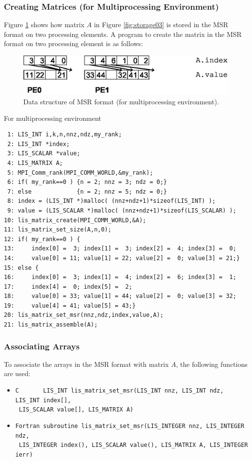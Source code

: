 \documentclass[a4paper]{article}
\begin{document}
\newpage
\subsubsection{Creating Matrices (for Multiprocessing Environment)}
Figure \ref{fig:storage03_mpi} shows how matrix $A$ in Figure
\ref{fig:storage03} is stored in the MSR format on two processing 
elements. A program to create the matrix in the MSR format on two processing element is as follows:
\begin{figure}[h]
{\centering 
\includegraphics{storage03_mpi.eps} 
\caption{Data structure of MSR format (for multiprocessing environment).}\label{fig:storage03_mpi}}
\end{figure}
\begin{itemsquarebox}[l]{For multiprocessing environment}
\small
\begin{verbatim}
 1: LIS_INT i,k,n,nnz,ndz,my_rank;
 2: LIS_INT *index;
 3: LIS_SCALAR *value;
 4: LIS_MATRIX A;
 5: MPI_Comm_rank(MPI_COMM_WORLD,&my_rank);
 6: if( my_rank==0 ) {n = 2; nnz = 3; ndz = 0;}
 7: else             {n = 2; nnz = 5; ndz = 0;}
 8: index = (LIS_INT *)malloc( (nnz+ndz+1)*sizeof(LIS_INT) );
 9: value = (LIS_SCALAR *)malloc( (nnz+ndz+1)*sizeof(LIS_SCALAR) );
10: lis_matrix_create(MPI_COMM_WORLD,&A);
11: lis_matrix_set_size(A,n,0);
12: if( my_rank==0 ) {
13:     index[0] =  3; index[1] =  3; index[2] =  4; index[3] =  0;
14:     value[0] = 11; value[1] = 22; value[2] =  0; value[3] = 21;}
15: else {
16:     index[0] =  3; index[1] =  4; index[2] =  6; index[3] =  1;
17:     index[4] =  0; index[5] =  2;
18:     value[0] = 33; value[1] = 44; value[2] =  0; value[3] = 32;
19:     value[4] = 41; value[5] = 43;}
20: lis_matrix_set_msr(nnz,ndz,index,value,A);
21: lis_matrix_assemble(A);
\end{verbatim}
\end{itemsquarebox}

\subsubsection{Associating Arrays}
To associate the arrays in the MSR format with matrix $A$, the following functions are used:
\begin{itemize}
\item \verb|C       LIS_INT lis_matrix_set_msr(LIS_INT nnz, LIS_INT ndz, LIS_INT index[],|\\
      \verb| LIS_SCALAR value[], LIS_MATRIX A)|
\item \verb|Fortran subroutine lis_matrix_set_msr(LIS_INTEGER nnz, LIS_INTEGER ndz,|\\
      \verb| LIS_INTEGER index(), LIS_SCALAR value(), LIS_MATRIX A, LIS_INTEGER ierr)|
\end{itemize}
\end{document}
